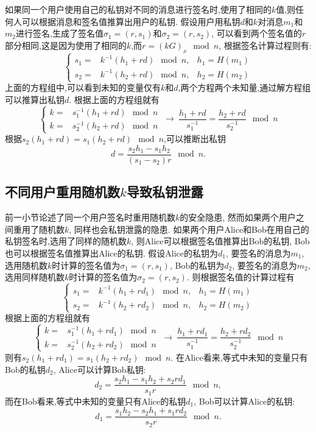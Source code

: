 \documentclass{article}
\begin{document}
如果同一个用户使用自己的私钥对不同的消息进行签名时,使用了相同的$k$值,则任何人可以根据消息和签名值推算出用户的私钥.
假设用户用私钥$d$和$k$对消息$m_1$和$m_2$进行签名,生成了签名值$\sigma_1=(r, s_1)$和$\sigma_2=(r, s_2)$,
可以看到两个签名值的$r$部分相同,这是因为使用了相同的$k$,而$r = (kG)_x \mod n$, 根据签名计算过程则有:
\begin{equation}\nonumber
\left\{
\begin{array}{lll}
s_1 = & k^{-1}(h_1 + rd) \mod n, & h_1 = H(m_1)\\
s_2 = & k^{-1}(h_2 + rd) \mod n, & h_2 = H(m_2)
\end{array}
\right.
\end{equation}
上面的方程组中,可以看到未知的变量仅有$k$和$d$,两个方程两个未知量,通过解方程组可以推算出私钥$d$.
根据上面的方程组就有
\begin{equation}\nonumber
\left\{
\begin{array}{ll}
k = & s_1^{-1} (h_1 + rd) \mod n \\
k = & s_2^{-1} (h_2 + rd) \mod n
\end{array}
\right.
\ 
\rightarrow
\ 
\dfrac{h_1+rd}{s_1^{-1}} = \dfrac{h_2+rd}{s_2^{-1}} \mod n
\end{equation}
根据$s_2(h_1+rd) = s_1(h_2+rd)\mod n$,可以推断出私钥
$$d = \dfrac{s_2h_1 - s_1h_2}{(s_1-s_2)r} \mod n.$$

\subsection{不同用户重用随机数$k$导致私钥泄露\label{subsec-2usereusek}}

前一小节论述了同一个用户签名时重用随机数$k$的安全隐患, 然而如果两个用户之间重用了随机数$k$, 同样也会私钥泄露的隐患.
如果两个用户Alice和Bob在用自己的私钥签名时,选用了同样的随机数$k$,
则Alice可以根据签名值推算出Bob的私钥, Bob也可以根据签名值推算出Alice的私钥.
假设Alice的私钥为$d_1$, 要签名的消息为$m_1$, 选用随机数$k$时计算的签名值为$\sigma_1 = (r, s_1)$,
Bob的私钥为$d_2$, 要签名的消息为$m_2$, 选用同样随机数$k$时计算的签名值为$\sigma_2 = (r, s_2)$.
则根据签名值的计算过程有
\begin{equation}\nonumber
\left\{
\begin{array}{lll}
s_1 = & k^{-1}(h_1 + rd_1) \mod n, & h_1 = H(m_1)\\
s_2 = & k^{-1}(h_2 + rd_2) \mod n, & h_2 = H(m_2)
\end{array}
\right.
\end{equation}
根据上面的方程组就有
\begin{equation}\nonumber
\left\{
\begin{array}{ll}
k = & s_1^{-1} (h_1 + rd_1) \mod n \\
k = & s_2^{-1} (h_2 + rd_2) \mod n
\end{array}
\right.
\ 
\rightarrow
\ 
\dfrac{h_1+rd_1}{s_1^{-1}} = \dfrac{h_2+rd_2}{s_2^{-1}} \mod n
\end{equation}
则有$s_2(h_1+rd_1) = s_1(h_2+rd_2) \mod n$.
在Alice看来,等式中未知的变量只有Bob的私钥$d_2$, Alice可以计算Bob私钥:
$$d_2 = \dfrac{s_2h_1 - s_1h_2 + s_2rd_1}{s_1r} \mod n,$$
而在Bob看来,等式中未知的变量只有Alice的私钥$d_1$, Bob可以计算Alice的私钥:
$$d_1 = \dfrac{s_1h_2 - s_2h_1 + s_1rd_2}{s_2r} \mod n.$$
\end{document}
